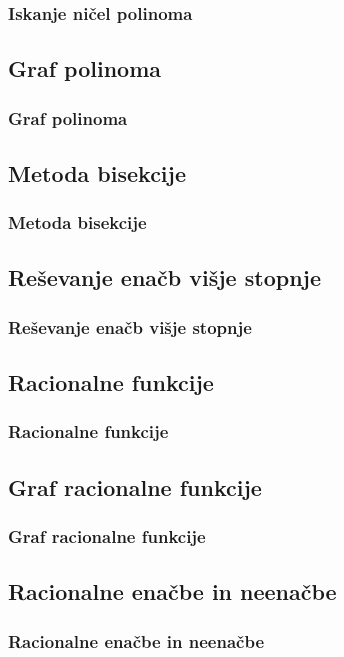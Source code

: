         \begin{frame}
            \frametitle{Iskanje ničel polinoma}
        \end{frame}

    \subsection{Graf polinoma}

        \begin{frame}
            \frametitle{Graf polinoma}
        \end{frame}

    \subsection{Metoda bisekcije}

        \begin{frame}
            \frametitle{Metoda bisekcije}
        \end{frame}

    \subsection{Reševanje enačb višje stopnje}

        \begin{frame}
            \frametitle{Reševanje enačb višje stopnje}
        \end{frame}

    \subsection{Racionalne funkcije}

        \begin{frame}
            \frametitle{Racionalne funkcije}
        \end{frame}

    \subsection{Graf racionalne funkcije}
        
        \begin{frame}
            \frametitle{Graf racionalne funkcije}
        \end{frame}

    \subsection{Racionalne enačbe in neenačbe}
        
        \begin{frame}
            \frametitle{Racionalne enačbe in neenačbe}
        \end{frame}